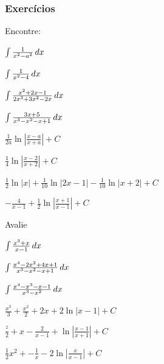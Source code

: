 \cleardoublepage\documentclass[../main.tex]{subfiles}
\begin{document}
\subsubsection{Exercícios}
\begin{exer}
Encontre:
\begin{multicols}{2}
\begin{compactenum}[a)]
\item $\int \frac{1}{x^2-a^2} \, dx$ 
\item $\int \frac{1}{x^2-4} \, dx$
\item $\int \frac{x^2+2x-1}{2x^3+3x^2-2x} \, dx$
\item $\int \frac{3x+5}{x^3-x^2-x+1} \, dx$
\end{compactenum}
\end{multicols}
\end{exer}
\begin{resp}
\begin{multicols}{2}
\begin{compactenum}[a)]
\item  $\frac{1}{2a}\ln\left|\frac{x-a}{x+a}\right|+C$
\item $\frac{1}{4}\ln\left|\frac{x-2}{x+2}\right|+C$
\item  $\frac{1}{2}\ln |x|+\frac{1}{10}\ln|2x-1|-\frac{1}{10}\ln|x+2|+C$
\item $-\frac{4}{x-1}+\frac{1}{2}\ln\left|\frac{x+1}{x-1}\right|+C$
\end{compactenum}
\end{multicols}
\end{resp}

\begin{exer}
Avalie
\begin{multicols}{2}
\begin{compactenum}[a)]
\item  $\int \frac{x^3+x}{x-1} \, dx$ 
\item  $\int \frac{x^4-2x^2+4x+1}{x^3-x^2-x+1} \, dx$
\item $\int \frac{x^4-x^3-x-1}{x^3-x^2} \, dx$
\end{compactenum}
\end{multicols}
\end{exer}
\begin{resp}
\begin{multicols}{2}
\begin{compactenum}[a)]
\item $\frac{x^3}{3}+\frac{x^2}{2}+2x+2\ln |x-1|+C$
\item $\frac{^2}{2}+x-\frac{2}{x-1}+\ln \left|\frac{x-1}{x+1}\right|+C$
\item $\frac{1}{2}x^2+-\frac{1}{x}-2\ln\left|\frac{x}{x-1}\right|+C$
\end{compactenum}
\end{multicols}
\end{resp}
\end{document}
